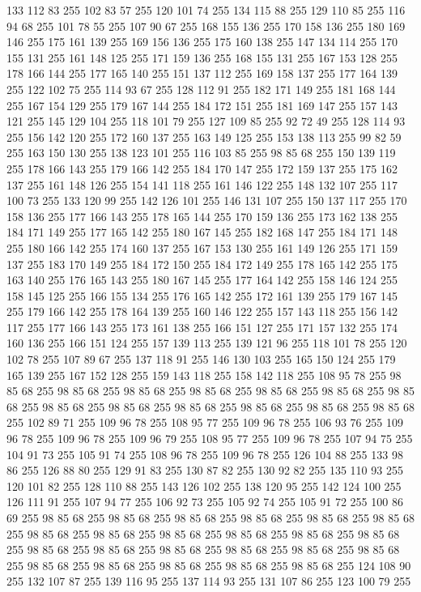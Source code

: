 133 112 83 255 102 83 57 255 120 101 74 255 134 115 88 255 129 110 85 255 116 94 68 255 101 78 55 255 107 90 67 255 168 155 136 255 170 158 136 255 180 169 146 255 175 161 139 255 169 156 136 255 175 160 138 255 147 134 114 255 170 155 131 255 161 148 125 255 171 159 136 255 168 155 131 255 167 153 128 255 178 166 144 255 177 165 140 255 151 137 112 255 169 158 137 255 177 164 139 255 122 102 75 255 114 93 67 255 128 112 91 255 182 171 149 255 181 168 144 255 167 154 129 255 179 167 144 255 184 172 151 255 181 169 147 255 157 143 121 255 145 129 104 255 118 101 79 255 127 109 85 255 92 72 49 255 128 114 93 255 156 142 120 255 172 160 137 255 163 149 125 255 153 138 113 255 99 82 59 255 163 150 130 255 138 123 101 255 116 103 85 255 98 85 68 255 150 139 119 255 178 166 143 255 179 166 142 255 184 170 147 255 172 159 137 255 175 162 137 255 161 148 126 255 154 141 118 255 161 146 122 255 148 132 107 255 117 100 73 255 133 120 99 255 142 126 101 255 146 131 107 255 150 137 117 255
170 158 136 255 177 166 143 255 178 165 144 255 170 159 136 255 173 162 138 255 184 171 149 255 177 165 142 255 180 167 145 255 182 168 147 255 184 171 148 255 180 166 142 255 174 160 137 255 167 153 130 255 161 149 126 255 171 159 137 255 183 170 149 255 184 172 150 255 184 172 149 255 178 165 142 255 175 163 140 255 176 165 143 255 180 167 145 255 177 164 142 255 158 146 124 255 158 145 125 255 166 155 134 255 176 165 142 255 172 161 139 255 179 167 145 255 179 166 142 255 178 164 139 255 160 146 122 255 157 143 118 255 156 142 117 255 177 166 143 255 173 161 138 255 166 151 127 255 171 157 132 255 174 160 136 255 166 151 124 255 157 139 113 255 139 121 96 255 118 101 78 255 120 102 78 255 107 89 67 255 137 118 91 255 146 130 103 255 165 150 124 255 179 165 139 255 167 152 128 255 159 143 118 255 158 142 118 255 108 95 78 255 98 85 68 255 98 85 68 255 98 85 68 255 98 85 68 255 98 85 68 255 98 85 68 255 98 85 68 255 98 85 68 255 98 85 68 255 98 85 68 255 98 85 68 255
98 85 68 255 98 85 68 255 102 89 71 255 109 96 78 255 108 95 77 255 109 96 78 255 106 93 76 255 109 96 78 255 109 96 78 255 109 96 79 255 108 95 77 255 109 96 78 255 107 94 75 255 104 91 73 255 105 91 74 255 108 96 78 255 109 96 78 255 126 104 88 255 133 98 86 255 126 88 80 255 129 91 83 255 130 87 82 255 130 92 82 255 135 110 93 255 120 101 82 255 128 110 88 255 143 126 102 255 138 120 95 255 142 124 100 255 126 111 91 255 107 94 77 255 106 92 73 255 105 92 74 255 105 91 72 255 100 86 69 255 98 85 68 255 98 85 68 255 98 85 68 255 98 85 68 255 98 85 68 255 98 85 68 255 98 85 68 255 98 85 68 255 98 85 68 255 98 85 68 255 98 85 68 255 98 85 68 255 98 85 68 255 98 85 68 255 98 85 68 255 98 85 68 255 98 85 68 255 98 85 68 255 98 85 68 255 98 85 68 255 98 85 68 255 98 85 68 255 98 85 68 255 124 108 90 255 132 107 87 255 139 116 95 255 137 114 93 255 131 107 86 255 123 100 79 255
